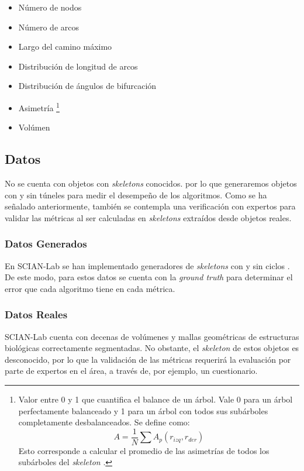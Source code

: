 \begin{itemize}
\item Número de nodos
\item Número de arcos
\item Largo del camino máximo
\item Distribución de longitud de arcos
\item Distribución de ángulos de bifurcación
\item Asimetría \footnote{Valor entre 0 y 1 que cuantifica el balance de un árbol. Vale 0 para un árbol perfectamente balanceado y 1 para un árbol con todos sus subárboles completamente desbalanceados. Se define como:
\[
A = \frac{1}{N}\sum A_{p}(r_{izq},r_{der})
\]
Esto corresponde a calcular el promedio de las asimetrías de todos los subárboles del \textit{skeleton} \cite{van2004morphological}.}
\item Volúmen
\end{itemize}

\subsection{Datos}

No se cuenta con objetos con \textit{skeletons} conocidos. por lo que generaremos objetos con y sin túneles para medir el desempeño de los algoritmos. Como se ha señalado anteriormente, también se contempla una verificación con expertos para validar las métricas al ser calculadas en \textit{skeletons} extraídos desde objetos reales.

\subsubsection{Datos Generados}

En SCIAN-Lab se han implementado generadores de \textit{skeletons} con y sin ciclos \cite{villarroel2012}. De este modo, para estos datos se cuenta con la \textit{ground truth} para determinar el error que cada algoritmo tiene en cada métrica.

\subsubsection{Datos Reales}

SCIAN-Lab cuenta con decenas de volúmenes y mallas geométricas de estructuras biológicas correctamente segmentadas. No obstante, el \textit{skeleton} de estos objetos es desconocido, por lo que la validación de las métricas requerirá la evaluación por parte de expertos en el área, a través de, por ejemplo, un cuestionario.


